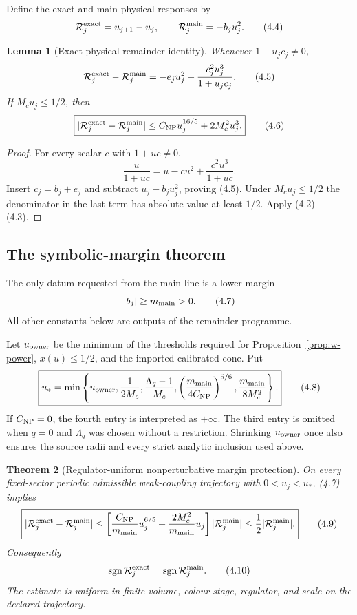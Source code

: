 \documentclass[11pt]{article}
\newtheorem{theorem}{Theorem}[section]
\newtheorem{lemma}[theorem]{Lemma}
\theoremstyle{definition}
\theoremstyle{remark}
\newcommand{\cR}{\mathcal R}
\begin{document}
Define the exact and main physical responses by
\[
 \cR_j^{\rm exact}=u_{j+1}-u_j,\qquad
 \cR_j^{\rm main}=-b_ju_j^2.                               \tag{4.4}
\]

\begin{lemma}[Exact physical remainder identity]
\label{lem:physical-identity}
Whenever $1+u_jc_j\ne0$,
\[
 \cR_j^{\rm exact}-\cR_j^{\rm main}
 =-e_ju_j^2+\frac{c_j^2u_j^3}{1+u_jc_j}.                   \tag{4.5}
\]
If $M_cu_j\le1/2$, then
\[
 \boxed{
 |\cR_j^{\rm exact}-\cR_j^{\rm main}|
 \le C_{\rm NP}u_j^{16/5}+2M_c^2u_j^3.}                   \tag{4.6}
\]
\end{lemma}

\begin{proof}
For every scalar $c$ with $1+uc\ne0$,
\[
 \frac{u}{1+uc}=u-cu^2+\frac{c^2u^3}{1+uc}.
\]
Insert $c_j=b_j+e_j$ and subtract $u_j-b_ju_j^2$, proving
(4.5).  Under $M_cu_j\le1/2$ the denominator in the last term has
absolute value at least $1/2$.  Apply (4.2)--(4.3).
\end{proof}

\subsection{The symbolic-margin theorem}

The only datum requested from the main line is a lower margin
\[
 |b_j|\ge m_{\rm main}>0.                                  \tag{4.7}
\]
All other constants below are outputs of the remainder programme.

Let $u_{\rm owner}$ be the minimum of the thresholds required for
Proposition~\ref{prop:w-power}, $x(u)\le1/2$, and the imported calibrated
cone.  Put
\[
\boxed{
 u_*=
 \min\left\{
 u_{\rm owner},
 \frac1{2M_c},
 \frac{\Lambda_q-1}{M_c},
 \left(\frac{m_{\rm main}}{4C_{\rm NP}}\right)^{5/6},
 \frac{m_{\rm main}}{8M_c^2}
 \right\}.}                                                \tag{4.8}
\]
If $C_{\rm NP}=0$, the fourth entry is interpreted as $+\infty$.
The third entry is omitted when $q=0$ and $\Lambda_q$ was chosen without a
restriction.  Shrinking $u_{\rm owner}$ once also ensures the source radii
and every strict analytic inclusion used above.

\begin{theorem}[Regulator-uniform nonperturbative margin protection]
\label{thm:margin-protection}
On every fixed-sector periodic admissible weak-coupling trajectory with
$0<u_j<u_*$, (4.7) implies
\[
\boxed{
 |\cR_j^{\rm exact}-\cR_j^{\rm main}|
 \le
 \left[
 \frac{C_{\rm NP}}{m_{\rm main}}u_j^{6/5}
 +\frac{2M_c^2}{m_{\rm main}}u_j
 \right]|\cR_j^{\rm main}|
 \le\frac12|\cR_j^{\rm main}|.}                          \tag{4.9}
\]
Consequently
\[
 \operatorname{sgn}\cR_j^{\rm exact}
 =\operatorname{sgn}\cR_j^{\rm main}.                    \tag{4.10}
\]
The estimate is uniform in finite volume, colour stage, regulator, and scale
on the declared trajectory.
\end{theorem}
\end{document}
